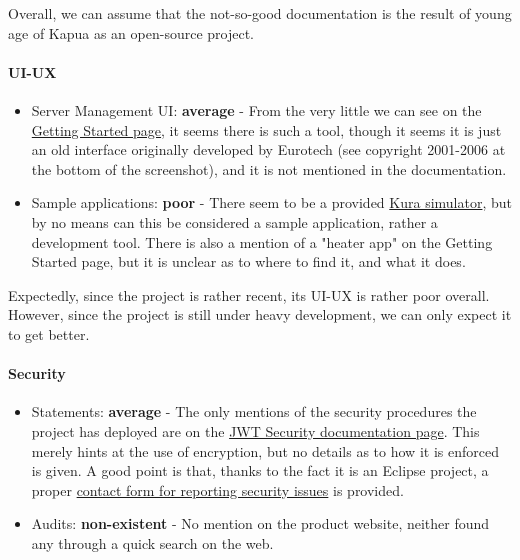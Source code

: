 \documentclass{article}
\begin{document}
Overall, we can assume that the not-so-good documentation is the result of young age of Kapua as an open-source project.

\paragraph{UI-UX}

\begin{itemize}
\item Server Management UI: \textbf{average} - From the very little we can see on the \href{https://www.eclipse.org/kapua/getting-started.php}{Getting Started page}, it seems there is such a tool, though it seems it is just an old interface originally developed by Eurotech (see copyright 2001-2006 at the bottom of the screenshot), and it is not mentioned in the documentation.
\item Sample applications: \textbf{poor} - There seem to be a provided \href{http://download.eclipse.org/kapua/docs/develop/user-manual/en/simulator.html}{Kura simulator}, but by no means can this be considered a sample application, rather a development tool. There is also a mention of a "heater app" on the Getting Started page, but it is unclear as to where to find it, and what it does.
\end{itemize}

Expectedly, since the project is rather recent, its UI-UX is rather poor overall. However, since the project is still under heavy development, we can only expect it to get better.

\paragraph{Security}

\begin{itemize}
\item Statements: \textbf{average} - The only mentions of the security procedures the project has deployed are on the \href{http://download.eclipse.org/kapua/docs/develop/user-manual/en/jwt_security.html}{JWT Security documentation page}. This merely hints at the use of encryption, but no details as to how it is enforced is given. A good point is that, thanks to the fact it is an Eclipse project, a proper \href{https://github.com/eclipse/kapua/issues}{contact form for reporting security issues} is provided.
\item Audits: \textbf{non-existent} - No mention on the product website, neither found any through a quick search on the web.
\end{itemize}
\end{document}
